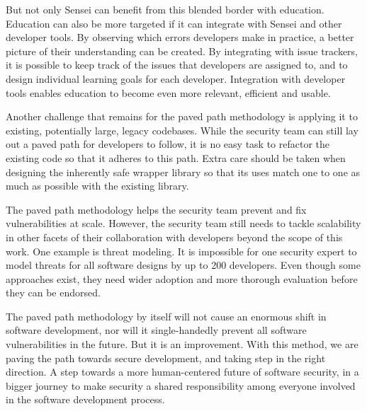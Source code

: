 But not only Sensei can benefit from this blended border with education.
Education can also be more targeted if it can integrate with Sensei and other developer tools. By observing which errors developers make in practice, a better picture of their understanding can be created.
By integrating with issue trackers, it is possible to keep track of the issues that developers are assigned to, and to design individual learning goals for each developer.
Integration with developer tools enables education to become even more relevant, efficient and usable.

Another challenge that remains for the paved path methodology is applying it to existing, potentially large, legacy codebases. While the security team can still lay out a paved path for developers to follow, it is no easy task to refactor the existing code so that it adheres to this path. 
Extra care should be taken when designing the inherently safe wrapper library so that its uses match one to one as much as possible with the existing library. 

The paved path methodology helps the security team prevent and fix vulnerabilities at scale.
However, the security team still needs to tackle scalability in other facets of their collaboration with developers beyond the scope of this work.
One example is threat modeling.
It is impossible for one security expert to model threats for all software designs by up to 200 developers. 
Even though some approaches exist, they need wider adoption and more thorough evaluation before they can be endorsed.


The paved path methodology by itself will not cause an enormous shift in software development, nor will it single-handedly prevent all software vulnerabilities in the future.
But it is an improvement.
With this method, we are paving the path towards secure development, and taking step in the right direction.
A step towards a more human-centered future of software security, in a bigger journey to make security a shared responsibility among everyone involved in the software development process.